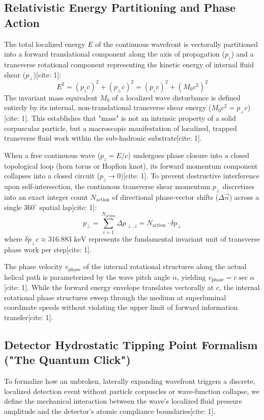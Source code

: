 \documentclass[11pt,a4paper]{article}
\begin{document}
	\subsection{Relativistic Energy Partitioning and Phase Action}
	The total localized energy $E$ of the continuous wavefront is vectorally partitioned into a forward translational component along the axis of propagation ($p_z$) and a transverse rotational component representing the kinetic energy of internal fluid shear ($p_\perp$)[cite: 1]:
	\begin{equation}
		E^2 = (p_z c)^2 + (p_\perp c)^2 = (p_z c)^2 + (M_0 c^2)^2
	\end{equation}
	The invariant mass equivalent $M_0$ of a localized wave disturbance is defined entirely by its internal, non-translational transverse shear energy ($M_0 c^2 = p_\perp c$)[cite: 1]. This establishes that "mass" is not an intrinsic property of a solid corpuscular particle, but a macroscopic manifestation of localized, trapped transverse fluid work within the sub-hadronic substrate[cite: 1].
	
	When a free continuous wave ($p_z = E/c$) undergoes phase closure into a closed topological loop (horn torus or Hopfion knot), its forward momentum component collapses into a closed circuit ($p_z \to 0$)[cite: 1]. To prevent destructive interference upon self-intersection, the continuous transverse shear momentum $p_\perp$ discretizes into an exact integer count $N_{\text{action}}$ of directional phase-vector shifts ($\Delta\vec{n}$) across a single $360^\circ$ spatial lap[cite: 1]:
	\begin{equation}
		p_\perp = \sum_{i=1}^{N_{\text{action}}} \Delta p_{\perp, i} = N_{\text{action}} \cdot \delta p_\perp
	\end{equation}
	where $\delta p_\perp c \approx 316.883\text{ keV}$ represents the fundamental invariant unit of transverse phase work per step[cite: 1].
	
	The phase velocity $v_{\text{phase}}$ of the internal rotational structures along the actual helical path is parameterized by the wave pitch angle $\alpha$, yielding $v_{\text{phase}} = c \sec \alpha$[cite: 1]. While the forward energy envelope translates vectorally at $c$, the internal rotational phase structures sweep through the medium at superluminal coordinate speeds without violating the upper limit of forward information transfer[cite: 1].
	
	\subsection{Detector Hydrostatic Tipping Point Formalism ("The Quantum Click")}
	To formalize how an unbroken, laterally expanding wavefront triggers a discrete, localized detection event without particle corpuscles or wave-function collapse, we define the mechanical interaction between the wave's localized fluid pressure amplitude and the detector's atomic compliance boundaries[cite: 1].
	
\end{document}
